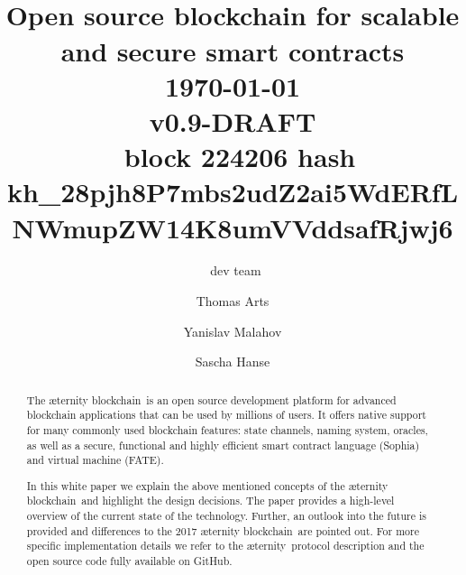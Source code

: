 \documentclass{article}
\author{\aet\ dev team  \and Thomas Arts \and
             Yanislav Malahov \and Sascha Hanse}
\title{\huge \Aet\  \\[0.5em] \large Open source blockchain for
scalable and secure smart contracts  \\[1em]\today \\[1em] v0.9-DRAFT \\[0.4em]
\blockchain\ block 224206 hash
kh_28pjh8P7mbs2udZ2ai5WdERfLNWmupZW14K8umVVddsafRjwj6}
\newcommand{\blockchain}{{\ae}ternity blockchain}
\newcommand{\aet}{{\ae}ternity}
\begin{document}
\maketitle


%
\begin{abstract}
The \blockchain\ is an open source development platform for advanced blockchain
applications that can be used by millions of users.
It offers native support for many commonly used
blockchain features: state channels, naming system, oracles, as well as a
secure, functional and highly efficient smart contract language (Sophia) and
virtual machine (FATE).

In this white paper we explain the above mentioned concepts of the
\blockchain\ and highlight the design decisions. The
paper provides a high-level overview of the current state of the
technology. Further, an outlook into the future is provided and differences
to the 2017 \blockchain\ are pointed out. For more specific implementation
details we refer to the \aet\ protocol description
and the open source code fully available on GitHub.

\end{abstract}


\newpage

\tableofcontents

\newpage








 
\end{document}
